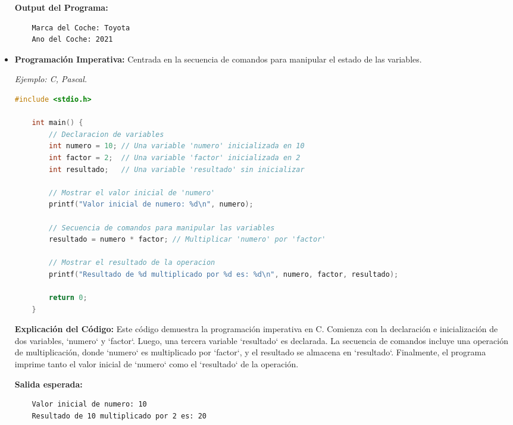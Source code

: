 \documentclass{report}
\begin{document}
\begin{itemize}
    \textbf{Output del Programa:}
    \begin{verbatim}
    Marca del Coche: Toyota
    Ano del Coche: 2021
    \end{verbatim}

\item \textbf{Programación Imperativa:} Centrada en la secuencia de comandos para manipular el estado de las variables. 

\textit{Ejemplo: C, Pascal.}

\begin{minipage}{\linewidth} 
    \begin{lstlisting}[language=C, caption=Ejemplo de Programacion Imperativa en C]
    #include <stdio.h>
    
    int main() {
        // Declaracion de variables
        int numero = 10; // Una variable 'numero' inicializada en 10
        int factor = 2;  // Una variable 'factor' inicializada en 2
        int resultado;   // Una variable 'resultado' sin inicializar
    
        // Mostrar el valor inicial de 'numero'
        printf("Valor inicial de numero: %d\n", numero);
    
        // Secuencia de comandos para manipular las variables
        resultado = numero * factor; // Multiplicar 'numero' por 'factor'
        
        // Mostrar el resultado de la operacion
        printf("Resultado de %d multiplicado por %d es: %d\n", numero, factor, resultado);
    
        return 0;
    }
    \end{lstlisting}
    
    \textbf{Explicación del Código:} Este código demuestra la programación imperativa en C. Comienza con la declaración e inicialización de dos variables, `numero` y `factor`. Luego, una tercera variable `resultado` es declarada. La secuencia de comandos incluye una operación de multiplicación, donde `numero` es multiplicado por `factor`, y el resultado se almacena en `resultado`. Finalmente, el programa imprime tanto el valor inicial de `numero` como el `resultado` de la operación.
    
    \textbf{Salida esperada:}
    \begin{verbatim}
    Valor inicial de numero: 10
    Resultado de 10 multiplicado por 2 es: 20
    \end{verbatim}
    \end{minipage}


\end{itemize}
\end{document}
